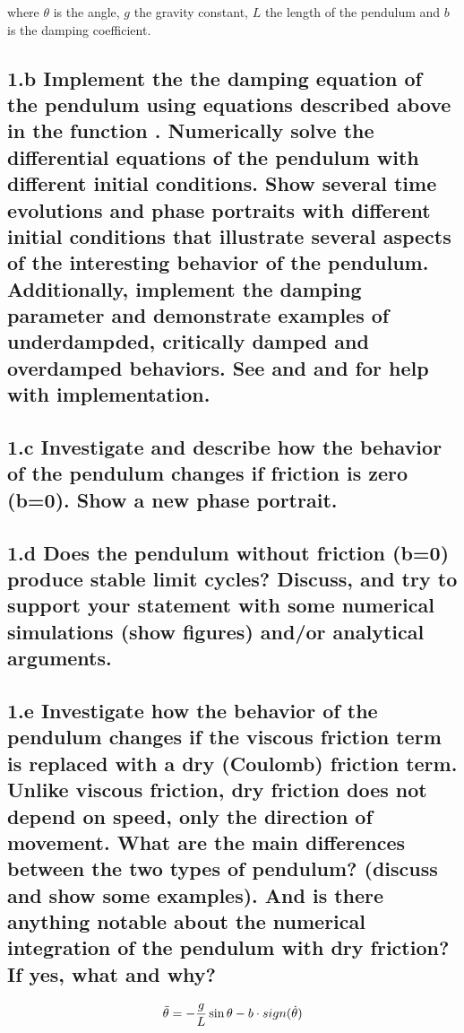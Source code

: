 \documentclass{cmc}
\begin{document}
where $\theta$ is the angle, $g$ the gravity constant, $L$ the length of the pendulum
and $b$ is the damping coefficient.


\subsection*{1.b Implement the the damping equation of the pendulum using equations described above in the function
  . Numerically solve the differential equations of the pendulum
  with different initial conditions.  Show several time evolutions and phase
  portraits with different initial conditions that illustrate several aspects of
  the interesting behavior of the pendulum. Additionally, implement the damping parameter and demonstrate examples of underdampded, critically damped and overdamped behaviors.
  See  and  and
   for help with implementation.}


\subsection*{1.c Investigate and describe how the behavior of the pendulum
  changes if friction is zero (b=0).  Show a new phase portrait.}


\subsection*{1.d Does the pendulum without friction (b=0) produce stable limit
  cycles? Discuss, and try to support your statement with some numerical
  simulations (show figures) and/or analytical arguments.}


\subsection*{1.e Investigate how the behavior of the pendulum changes if the
  viscous friction term is replaced with a dry (Coulomb) friction term. Unlike
  viscous friction, dry friction does not depend on speed, only the direction of
  movement. What are the main differences between the two types of pendulum?
  (discuss and show some examples). And is there anything notable about the
  numerical integration of the pendulum with dry friction? If yes, what and why?}

\begin{equation}
  \label{eq:ode-pendulum-dry}
  \ddot{\theta} = - {g \over L} \sin \theta - b \cdot sign(\dot{\theta})
\end{equation}
\end{document}
